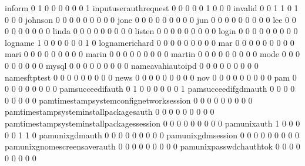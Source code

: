 \documentclass[compress,8pt]{beamer}
\begin{document}
\begin{frame}
\begin{Schunk}
  inform                                     0   1   0   0   0   0   0   0   1
  inputuserauthrequest                       0   0   0   0   0   1   0   0   0
  invalid                                    0   0   1   1   0   1   0   0   0
  johnson                                    0   0   0   0   0   0   0   0   0
  jone                                       0   0   0   0   0   0   0   0   0
  jun                                        0   0   0   0   0   0   0   0   0
  lee                                        0   0   0   0   0   0   0   0   0
  linda                                      0   0   0   0   0   0   0   0   0
  listen                                     0   0   0   0   0   0   0   0   0
  login                                      0   0   0   0   0   0   0   0   0
  logname                                    1   0   0   0   0   0   0   1   0
  lognamerichard                             0   0   0   0   0   0   0   0   0
  mar                                        0   0   0   0   0   0   0   0   0
  mari                                       0   0   0   0   0   0   0   0   0
  marin                                      0   0   0   0   0   0   0   0   0
  martin                                     0   0   0   0   0   0   0   0   0
  mode                                       0   0   0   0   0   0   0   0   0
  mysql                                      0   0   0   0   0   0   0   0   0
  nameavahiautoipd                           0   0   0   0   0   0   0   0   0
  namesftptest                               0   0   0   0   0   0   0   0   0
  news                                       0   0   0   0   0   0   0   0   0
  nov                                        0   0   0   0   0   0   0   0   0
  pam                                        0   0   0   0   0   0   0   0   0
  pamsucceedifauth                           0   1   0   0   0   0   0   0   1
  pamsucceedifgdmauth                        0   0   0   0   0   0   0   0   0
  pamtimestampsystemconfignetworksession     0   0   0   0   0   0   0   0   0
  pamtimestampsysteminstallpackagesauth      0   0   0   0   0   0   0   0   0
  pamtimestampsysteminstallpackagessession   0   0   0   0   0   0   0   0   0
  pamunixauth                                1   0   0   0   0   0   1   1   0
  pamunixgdmauth                             0   0   0   0   0   0   0   0   0
  pamunixgdmsession                          0   0   0   0   0   0   0   0   0
  pamunixgnomescreensaverauth                0   0   0   0   0   0   0   0   0
  pamunixpasswdchauthtok                     0   0   0   0   0   0   0   0   0

\end{Schunk}
\end{frame}
\end{document}
